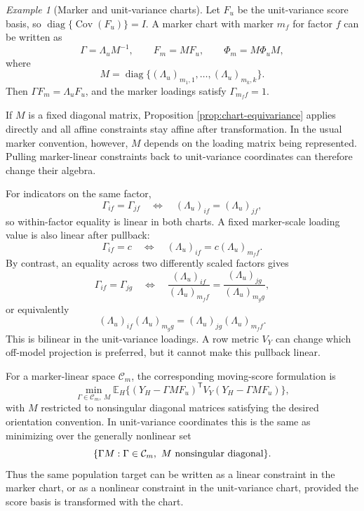 \documentclass[11pt]{article}
\newcommand{\T}{^{\mathsf T}}
\newcommand{\E}{\mathbb{E}}
\newcommand{\Cov}{\operatorname{Cov}}
\newcommand{\diag}{\operatorname{diag}}
\theoremstyle{plain}
\theoremstyle{remark}
\newtheorem*{example}{Example}
\begin{document}
\begin{example}[Marker and unit-variance charts]
Let \(F_u\) be the unit-variance score basis, so
\(\diag\{\Cov(F_u)\}=I\). A marker chart with marker \(m_f\) for factor \(f\)
can be written as
\[
  \Gamma=\Lambda_u M^{-1},
  \qquad
  F_m=MF_u,
  \qquad
  \Phi_m=M\Phi_uM,
\]
where
\[
  M=\diag\{(\Lambda_u)_{m_1,1},\ldots,(\Lambda_u)_{m_k,k}\}.
\]
Then \(\Gamma F_m=\Lambda_uF_u\), and the marker loadings satisfy
\(\Gamma_{m_f f}=1\).

If \(M\) is a fixed diagonal matrix, Proposition
\ref{prop:chart-equivariance} applies directly and all affine constraints stay
affine after transformation. In the usual marker convention, however, \(M\)
depends on the loading matrix being represented. Pulling marker-linear
constraints back to unit-variance coordinates can therefore change their
algebra.

For indicators on the same factor,
\[
  \Gamma_{if}=\Gamma_{jf}
  \quad\Longleftrightarrow\quad
  (\Lambda_u)_{if}=(\Lambda_u)_{jf},
\]
so within-factor equality is linear in both charts. A fixed marker-scale
loading value is also linear after pullback:
\[
  \Gamma_{if}=c
  \quad\Longleftrightarrow\quad
  (\Lambda_u)_{if}=c(\Lambda_u)_{m_f f}.
\]
By contrast, an equality across two differently scaled factors gives
\[
  \Gamma_{if}=\Gamma_{jg}
  \quad\Longleftrightarrow\quad
  \frac{(\Lambda_u)_{if}}{(\Lambda_u)_{m_f f}}
  =
  \frac{(\Lambda_u)_{jg}}{(\Lambda_u)_{m_g g}},
\]
or equivalently
\[
  (\Lambda_u)_{if}(\Lambda_u)_{m_g g}
  =
  (\Lambda_u)_{jg}(\Lambda_u)_{m_f f}.
\]
This is bilinear in the unit-variance loadings. A row metric \(V_Y\) can change
which off-model projection is preferred, but it cannot make this pullback
linear.

For a marker-linear space \(\mathcal C_m\), the corresponding moving-score
formulation is
\[
  \min_{\Gamma\in\mathcal C_m,\ M}
    \E_H\{(Y_H-\Gamma M F_u)\T V_Y(Y_H-\Gamma M F_u)\},
\]
with \(M\) restricted to nonsingular diagonal matrices satisfying the desired
orientation convention. In unit-variance coordinates this is the same as
minimizing over the generally nonlinear set
\[
  \{\Gamma M:\Gamma\in\mathcal C_m,\ M
    \hbox{ nonsingular diagonal}\}.
\]
Thus the same population target can be written as a linear constraint in the
marker chart, or as a nonlinear constraint in the unit-variance chart, provided
the score basis is transformed with the chart.
\end{example}
\end{document}
